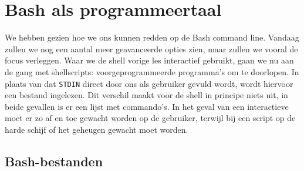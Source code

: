 \section{Bash als programmeertaal}
We hebben gezien hoe we ons kunnen redden op de Bash command line. Vandaag zullen we nog een aantal meer geavanceerde opties zien, maar zullen we vooral de focus verleggen. Waar we de shell vorige les interactief gebruikt, gaan we nu aan de gang met shellscripts: voorgeprogrammeerde programma's om te doorlopen. In plaats van dat \texttt{STDIN} direct door ons als gebruiker gevuld wordt, wordt hiervoor een bestand ingelezen. Dit verschil maakt voor de shell in principe niets uit, in beide gevallen is er een lijst met commando's. In het geval van een interactieve moet er zo af en toe gewacht worden op de gebruiker, terwijl bij een script op de harde schijf of het geheugen gewacht moet worden.

\subsection{Bash-bestanden}\label{bash-bestanden}

